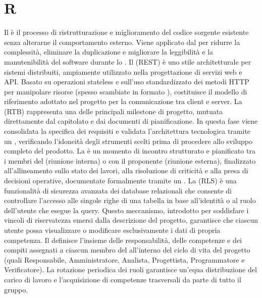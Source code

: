 \section{R}
Il  è il processo di ristrutturazione e miglioramento del codice sorgente esistente senza alterarne il comportamento esterno. Viene applicato dal  per ridurre la complessità, eliminare la duplicazione e migliorare la leggibilità e la manutenibilità del software durante lo .
Il  (REST) è uno stile architetturale per sistemi distribuiti, ampiamente utilizzato nella progettazione di servizi web e API. Basato su operazioni stateless e sull'uso standardizzato dei metodi HTTP per manipolare risorse (spesso scambiate in formato ), costituisce il modello di riferimento adottato nel progetto per la comunicazione tra client e server.
La  (RTB) rappresenta una delle principali milestone di progetto, mutuata direttamente dal capitolato e dai documenti di pianificazione. In questa fase viene consolidata la specifica dei requisiti e validata l'architettura tecnologica tramite un , verificando l'idoneità degli strumenti scelti prima di procedere allo sviluppo completo del prodotto.
La  è un momento di incontro strutturato e pianificato tra i membri del  (riunione interna) o con il proponente  (riunione esterna), finalizzato all'allineamento sullo stato dei lavori, alla risoluzione di criticità e alla presa di decisioni operative, documentate formalmente tramite un .
La  (RLS) è una funzionalità di sicurezza avanzata dei database relazionali che consente di controllare l'accesso alle singole righe di una tabella in base all'identità o al ruolo dell'utente che esegue la query. Questo meccanismo, introdotto per soddisfare i vincoli di riservatezza emersi dalla descrizione del progetto, garantisce che ciascun utente possa visualizzare o modificare esclusivamente i dati di propria competenza.
Il  definisce l'insieme delle responsabilità, delle competenze e dei compiti assegnati a ciascun membro del  all'interno del ciclo di vita del progetto (quali Responsabile, Amministratore, Analista, Progettista, Programmatore e Verificatore). La rotazione periodica dei ruoli garantisce un'equa distribuzione del carico di lavoro e l'acquisizione di competenze trasversali da parte di tutto il gruppo.
